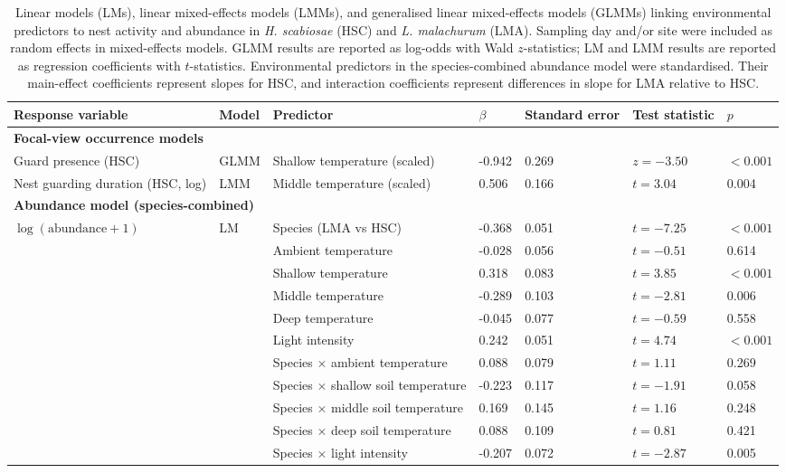 \documentclass[11pt,a4paper]{article}
\begin{document}

\begin{table}[!htbp]
\centering
\begingroup
\fontsize{9}{11}\selectfont

\caption{Linear models (LMs), linear mixed-effects models (LMMs), and generalised linear mixed-effects models (GLMMs) linking environmental predictors to nest activity and abundance in \textit{H. scabiosae} (HSC) and \textit{L. malachurum} (LMA). Sampling day and/or site were included as random effects in mixed-effects models. GLMM results are reported as log-odds with Wald $z$-statistics; LM and LMM results are reported as regression coefficients with $t$-statistics. Environmental predictors in the species-combined abundance model were standardised. Their main-effect coefficients represent slopes for HSC, and interaction coefficients represent differences in slope for LMA relative to HSC.}
\label{tab:lm_models}

\begin{tabular}{lllllll}
\toprule
Response variable & Model & Predictor & $\beta$ & Standard error & Test statistic & $p$ \\
\midrule

\multicolumn{7}{l}{\textbf{Focal-view occurrence models}} \\
Guard presence (HSC) & GLMM & Shallow temperature (scaled) & -0.942 & 0.269 & $z=-3.50$ & $<0.001$ \\

\midrule

Nest guarding duration (HSC, log) & LMM & Middle temperature (scaled) & 0.506 & 0.166 & $t=3.04$ & 0.004 \\

\midrule

\multicolumn{7}{l}{\textbf{Abundance model (species-combined)}} \\
$\log(\text{abundance} + 1)$ & LM & Species (LMA vs HSC) & -0.368 & 0.051 & $t=-7.25$ & $<0.001$ \\
& & Ambient temperature & -0.028 & 0.056 & $t=-0.51$ & 0.614 \\
& & Shallow temperature & 0.318 & 0.083 & $t=3.85$ & $<0.001$ \\
& & Middle temperature & -0.289 & 0.103 & $t=-2.81$ & 0.006 \\
& & Deep temperature & -0.045 & 0.077 & $t=-0.59$ & 0.558 \\
& & Light intensity & 0.242 & 0.051 & $t=4.74$ & $<0.001$ \\
& & Species $\times$ ambient temperature & 0.088 & 0.079 & $t=1.11$ & 0.269 \\
& & Species $\times$ shallow soil temperature & -0.223 & 0.117 & $t=-1.91$ & 0.058 \\
& & Species $\times$ middle soil temperature & 0.169 & 0.145 & $t=1.16$ & 0.248 \\
& & Species $\times$ deep soil temperature & 0.088 & 0.109 & $t=0.81$ & 0.421 \\
& & Species $\times$ light intensity & -0.207 & 0.072 & $t=-2.87$ & 0.005 \\
\bottomrule
\end{tabular}

\endgroup
\end{table}
\end{document}
